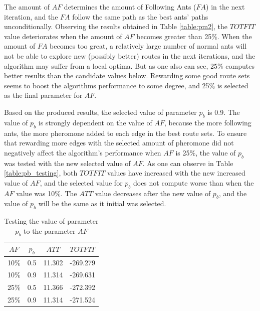 The amount of $AF$ determines the amount of Following Ants ($FA$) in the next iteration, and the $FA$ follow the same path as the best ants' paths unconditionally. Observing the results obtained in Table \vref{table:pm2}, the $TOTFIT$ value deteriorates when the amount of $AF$ becomes greater than 25\%. When the amount of $FA$ becomes too great, a relatively large number of normal ants will not be able to explore new (possibly better) routes in the next iterations, and the algorithm may suffer from a local optima. But as one also can see, 25\% computes better results than the candidate values below. Rewarding some good route sets seems to boost the algorithms performance to some degree, and 25\% is selected as the final parameter for $AF$.

Based on the produced results, the selected value of parameter $p_b$ is 0.9. The value of $p_b$ is strongly dependent on the value of $AF$, because the more following ants, the more pheromone added to each edge in the best route sets. To ensure that rewarding more edges with the selected amount of pheromone did not negatively affect the algorithm's performance when $AF$ is 25\%, the value of $p_b$ was tested with the new selected value of $AF$. As one can observe in Table \vref{table:pb_testing}, both $TOTFIT$ values have increased with the new increased value of $AF$, and the selected value for $p_b$ does not compute worse than when the $AF$ value was 10\%. The $ATT$ value decreases after the new value of $p_b$, and the value of $p_b$ will be the same as it initial was selected. 

    \begin{table}[H]
    \centering
    \begin{tabular}{|c|c||c|c|}
    \hline
    $AF$ & $p_b$ & $ATT$ & $TOTFIT$\\
    \hline
    10\% & 0.5 & 11.302 & -269.279 \\
    10\% & 0.9 & 11.314 & -269.631 \\
    25\% & 0.5 & 11.366 & -272.392 \\
    25\% & 0.9 & 11.314 & -271.524 \\
    \hline
    \end{tabular}
    \caption {Testing the value of parameter $p_b$ to the parameter $AF$}
    \label{table:pb_testing}
    \end{table}

